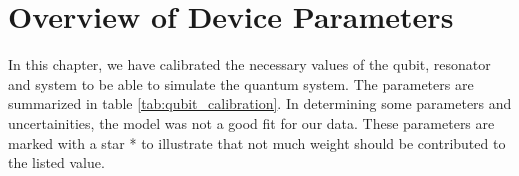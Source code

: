 


\FloatBarrier
\section{Overview of Device Parameters}\label{sec:overview_section}
In this chapter, we have calibrated the necessary values of the qubit, resonator and system to be able to simulate the quantum system. The parameters are summarized in table \ref{tab:qubit_calibration}. In determining some parameters and uncertainities, the model was not a good fit for our data. These parameters are marked with a star * to illustrate that not much weight should be contributed to the listed value.


